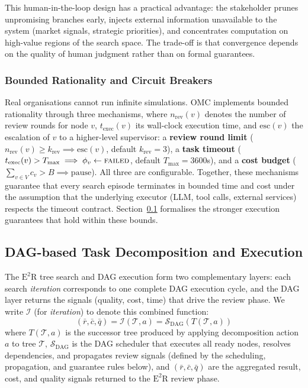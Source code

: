 \documentclass[11pt,a4paper]{article}
\begin{document}
This human-in-the-loop design has a practical advantage: the stakeholder prunes unpromising branches early, injects external information unavailable to the system (market signals, strategic priorities), and concentrates computation on high-value regions of the search space. The trade-off is that convergence depends on the quality of human judgment rather than on formal guarantees.

\subsubsection{Bounded Rationality and Circuit Breakers}
\label{subsubsection:brcb}
Real organisations cannot run infinite simulations.  OMC implements bounded rationality through three mechanisms, where $n_{\text{rev}}(v)$ denotes the number of review rounds for node $v$, $t_{\text{exec}}(v)$ its wall-clock execution time, and $\text{esc}(v)$ the escalation of $v$ to a higher-level supervisor: a \textbf{review round limit} ($n_{\text{rev}}(v) \geq k_{\text{rev}} \implies \text{esc}(v)$, default $k_{\text{rev}} = 3$), a \textbf{task timeout} ($t_{\text{exec}}(v) > T_{\max} \implies \phi_v \leftarrow \textsc{failed}$, default $T_{\max} = 3600$s), and a \textbf{cost budget} ($\sum_{v \in V} c_v > B \implies \text{pause}$).  All three are configurable.  Together, these mechanisms guarantee that every search episode terminates in bounded time and cost under the assumption that the underlying executor (LLM, tool calls, external services) respects the timeout contract.  Section~\ref{sec:dag} formalises the stronger execution guarantees that hold within these bounds.


\subsection{DAG-based Task Decomposition and Execution}
\label{sec:dag}

The $\text{E}^2$R tree search and DAG execution form two complementary layers: each search \emph{iteration} corresponds to one complete DAG execution cycle, and the DAG layer returns the signals (quality, cost, time) that drive the review phase.  We write $\mathcal{I}$ (for \emph{iteration}) to denote this combined function:
\begin{equation}
(\bar{r}, \bar{c}, \bar{q}) = \mathcal{I}(\mathcal{T}, a) = \mathcal{S}_{\text{DAG}}(T(\mathcal{T}, a))
\end{equation}
where $T(\mathcal{T}, a)$ is the successor tree produced by applying decomposition action $a$ to tree $\mathcal{T}$, $\mathcal{S}_{\text{DAG}}$ is the DAG scheduler that executes all ready nodes, resolves dependencies, and propagates review signals (defined by the scheduling, propagation, and guarantee rules below), and $(\bar{r}, \bar{c}, \bar{q})$ are the aggregated result, cost, and quality signals returned to the $\text{E}^2$R review phase.
\end{document}
